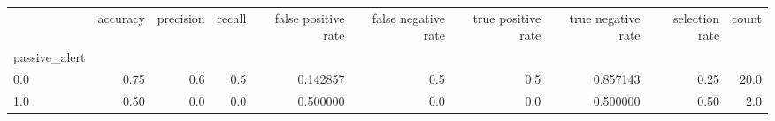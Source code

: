 \begin{tabular}{lrrrrrrrrr}
\toprule
{} &  accuracy &  precision &  recall &  false positive rate &  false negative rate &  true positive rate &  true negative rate &  selection rate &  count \\
passive\_alert &           &            &         &                      &                      &                     &                     &                 &        \\
\midrule
0.0           &      0.75 &        0.6 &     0.5 &             0.142857 &                  0.5 &                 0.5 &            0.857143 &            0.25 &   20.0 \\
1.0           &      0.50 &        0.0 &     0.0 &             0.500000 &                  0.0 &                 0.0 &            0.500000 &            0.50 &    2.0 \\
\bottomrule
\end{tabular}
